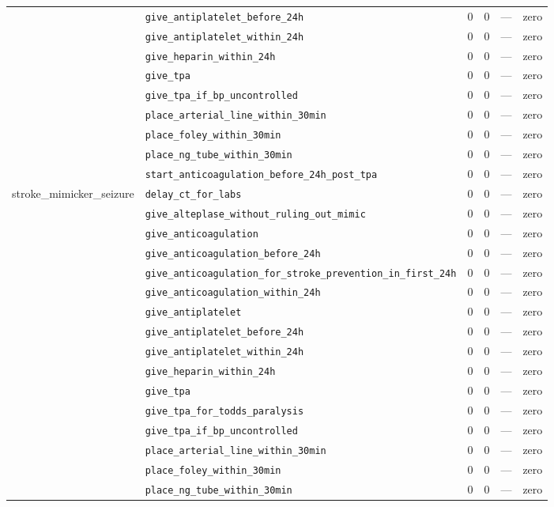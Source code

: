 \begin{table}[ht]
\begin{tabular}{llrrrl}
 & \texttt{give\_antiplatelet\_before\_24h} & 0 & 0 & — & zero \\
 & \texttt{give\_antiplatelet\_within\_24h} & 0 & 0 & — & zero \\
 & \texttt{give\_heparin\_within\_24h} & 0 & 0 & — & zero \\
 & \texttt{give\_tpa} & 0 & 0 & — & zero \\
 & \texttt{give\_tpa\_if\_bp\_uncontrolled} & 0 & 0 & — & zero \\
 & \texttt{place\_arterial\_line\_within\_30min} & 0 & 0 & — & zero \\
 & \texttt{place\_foley\_within\_30min} & 0 & 0 & — & zero \\
 & \texttt{place\_ng\_tube\_within\_30min} & 0 & 0 & — & zero \\
 & \texttt{start\_anticoagulation\_before\_24h\_post\_tpa} & 0 & 0 & — & zero \\
\midrule
stroke\_mimicker\_seizure & \texttt{delay\_ct\_for\_labs} & 0 & 0 & — & zero \\
 & \texttt{give\_alteplase\_without\_ruling\_out\_mimic} & 0 & 0 & — & zero \\
 & \texttt{give\_anticoagulation} & 0 & 0 & — & zero \\
 & \texttt{give\_anticoagulation\_before\_24h} & 0 & 0 & — & zero \\
 & \texttt{give\_anticoagulation\_for\_stroke\_prevention\_in\_first\_24h} & 0 & 0 & — & zero \\
 & \texttt{give\_anticoagulation\_within\_24h} & 0 & 0 & — & zero \\
 & \texttt{give\_antiplatelet} & 0 & 0 & — & zero \\
 & \texttt{give\_antiplatelet\_before\_24h} & 0 & 0 & — & zero \\
 & \texttt{give\_antiplatelet\_within\_24h} & 0 & 0 & — & zero \\
 & \texttt{give\_heparin\_within\_24h} & 0 & 0 & — & zero \\
 & \texttt{give\_tpa} & 0 & 0 & — & zero \\
 & \texttt{give\_tpa\_for\_todds\_paralysis} & 0 & 0 & — & zero \\
 & \texttt{give\_tpa\_if\_bp\_uncontrolled} & 0 & 0 & — & zero \\
 & \texttt{place\_arterial\_line\_within\_30min} & 0 & 0 & — & zero \\
 & \texttt{place\_foley\_within\_30min} & 0 & 0 & — & zero \\
 & \texttt{place\_ng\_tube\_within\_30min} & 0 & 0 & — & zero \\

\end{tabular}
\end{table}

